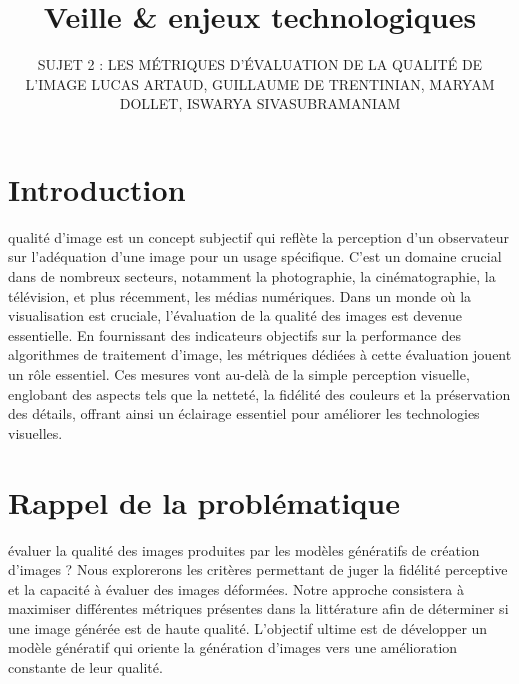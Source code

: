 \documentclass{ieeeaccess}
\begin{document}
\title{Veille \& enjeux technologiques}
\author{
\uppercase{Sujet 2 : Les métriques d'évaluation de la qualité de l'image}
\newline
\newline
\uppercase{Lucas Artaud},
\uppercase{Guillaume de Trentinian}, 
\uppercase{Maryam Dollet},
\uppercase{Iswarya Sivasubramaniam}
}
\address[1]{ESILV \& EMLV, 92400 Courbevoie, France 
(e-mail: lucas.artaud@edu.devinci.fr)}
\address[2]{ESILV, 92400 Courbevoie, France
(e-mail: guillaume.de\_trentinian@edu.devinci.fr)}
\address[3]{ESILV \& EMLV, 92400 Courbevoie, France
(e-mail: maryam.dollet@edu.devinci.fr)}
\address[4]{ESILV \& EMLV, 92400 Courbevoie, France
(e-mail: iswarya.sivasubramaniam@edu.devinci.fr)}

\titlepgskip=-90pt

\maketitle

\section*{Introduction}
 qualité d’image est un concept subjectif qui reflète la perception d’un observateur sur l’adéquation d’une image pour un usage spécifique. C’est un domaine crucial dans de nombreux secteurs, notamment la photographie, la cinématographie, la télévision, et plus récemment, les médias numériques.
Dans un monde où la visualisation est cruciale, l'évaluation de la qualité des images est devenue essentielle. En fournissant des indicateurs objectifs sur la performance des algorithmes de traitement d'image, les métriques dédiées à cette évaluation jouent un rôle essentiel. Ces mesures vont au-delà de la simple perception visuelle, englobant des aspects tels que la netteté, la fidélité des couleurs et la préservation des détails, offrant ainsi un éclairage essentiel pour améliorer les technologies visuelles.

\section{Rappel de la problématique}
 évaluer la qualité des images produites par les modèles génératifs de création d’images ?
Nous explorerons les critères permettant de juger la fidélité perceptive et la capacité à évaluer des images déformées. Notre approche consistera à maximiser différentes métriques présentes dans la littérature afin de déterminer si une image générée est de haute qualité. L'objectif ultime est de développer un modèle génératif qui oriente la génération d'images vers une amélioration constante de leur qualité.
\end{document}
